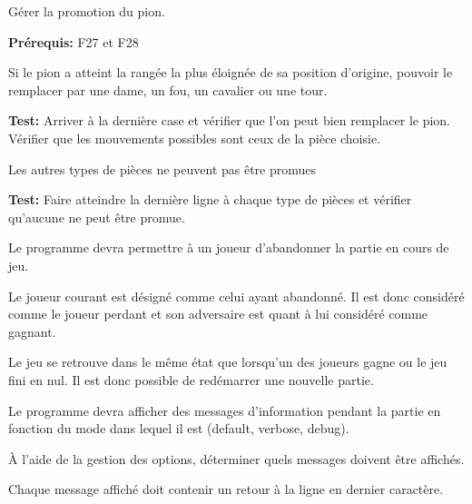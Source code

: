 \documentclass{article}
\begin{document}
\begin{needbox}
    Gérer la promotion du pion.

    \textbf{Prérequis:} F27 et F28
    \begin{subneedbox}
        Si le pion a atteint la rangée la plus éloignée de sa position d'origine, pouvoir le remplacer par
        une dame, un fou, un cavalier ou une tour.

        \textbf{Test:} Arriver à la dernière case et vérifier que l'on peut bien remplacer le pion. 
        Vérifier que les mouvements possibles sont ceux de la pièce choisie.
    \end{subneedbox}
    \begin{subneedbox}
        Les autres types de pièces ne peuvent pas être promues

        \textbf{Test:} Faire atteindre la dernière ligne à chaque type de pièces
         et vérifier qu'aucune ne peut être promue.
    \end{subneedbox}
\end{needbox}

\begin{needbox}[F32: Abandon]
    Le programme devra permettre à un joueur d'abandonner la partie en cours de jeu.
    \begin{subneedbox}[F32.1: Gagnant]
        Le joueur courant est désigné comme celui ayant abandonné.
        Il est donc considéré comme le joueur perdant et son adversaire
        est quant à lui considéré comme gagnant.
    \end{subneedbox}
    \begin{subneedbox}
        Le jeu se retrouve dans le même état que lorsqu'un des joueurs
        gagne ou le jeu fini en nul. Il est donc possible de redémarrer
        une nouvelle partie.
    \end{subneedbox}
\end{needbox}

\begin{needbox}
    Le programme devra afficher des messages d'information
    pendant la partie en fonction du mode dans lequel il est
    (default, verbose, debug).
    \begin{subneedbox}
        À l'aide de la gestion des options, déterminer quels messages doivent être affichés.
    \end{subneedbox}
    \begin{subneedbox}
        Chaque message affiché doit contenir un retour à la ligne en dernier caractère.
    \end{subneedbox}
\end{needbox}
\end{document}

